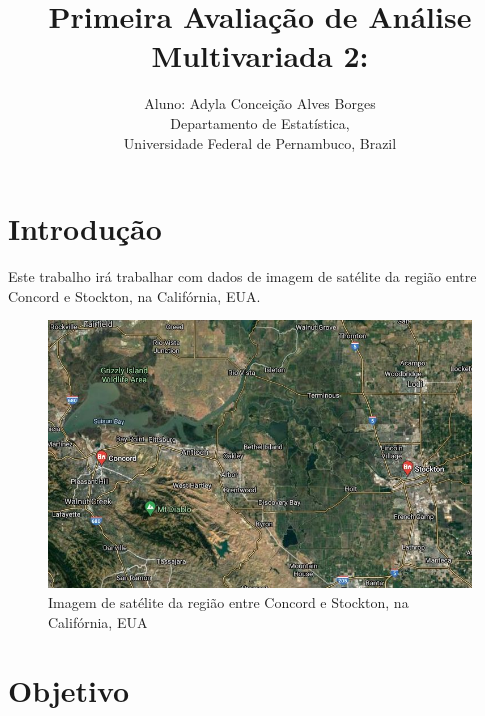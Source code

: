 \documentclass[a4paper,12pt]{article}
\begin{document}
\title{
{\sf Primeira Avaliação de Análise Multivariada 2}:\\
}

\author{
Aluno: Adyla Conceição Alves Borges\\
Departamento de Estat\'istica,\\
Universidade Federal de Pernambuco, Brazil
}


\maketitle



\section{Introdução}
\label{sec:INTRO} 

Este trabalho irá trabalhar com dados de imagem de satélite da região entre Concord e Stockton, na Califórnia, EUA. 

\begin{center}
\begin{figure}[H]
    \centering
    \includegraphics[width = 1 \textwidth]{satelite.JPG}
    \caption{Imagem de satélite da região entre Concord e Stockton, na Califórnia, EUA }
\end{figure}    
\end{center}

\section{Objetivo}
\end{document}
